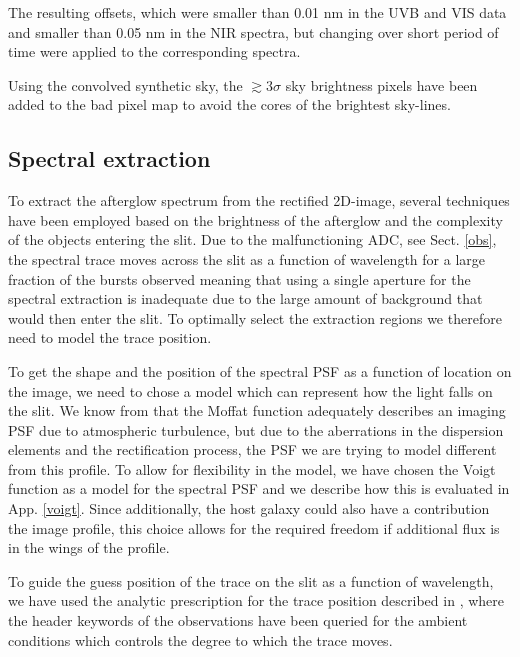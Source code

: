 \documentclass{aa}    %
\begin{document}
The resulting offsets, which were smaller than 0.01 nm in the UVB and VIS data
and smaller than 0.05 nm in the NIR spectra, but changing over short period of
time were applied to the corresponding spectra.

Using the convolved synthetic sky, the $\gtrsim 3 \sigma$ sky brightness pixels
have been added to the bad pixel map to avoid the cores of the brightest
sky-lines.

\subsection{Spectral extraction}    \label{extract}

To extract the afterglow spectrum from the rectified 2D-image, several
techniques have been employed based on the brightness of the afterglow and the
complexity of the objects entering the slit. Due to the malfunctioning ADC, see
Sect. \ref{obs}, the spectral trace moves across the slit as a function of
wavelength for a large fraction of the bursts observed meaning that using a
single aperture for the spectral extraction is inadequate due to the large
amount of background that would then enter the slit. To optimally select the
extraction regions we therefore need to model the trace position.

To get the shape and the position of the spectral PSF as a function of location
on the image, we need to chose a model which can represent how the light falls
on the slit. We know from \citet{Trujillo2001} that the Moffat function
\citep{Moffat1969} adequately describes an imaging PSF due to atmospheric
turbulence, but due to the aberrations in the dispersion elements and the
rectification process, the PSF we are trying to model different from this
profile. To allow for flexibility in the model, we have chosen the Voigt
function as a model for the spectral PSF and we describe how this is evaluated
in App. \ref{voigt}. Since additionally, the host galaxy could also have a
contribution the image profile, this choice allows for the required freedom if
additional flux is in the wings of the profile.

To guide the guess position of the trace on the slit as a function of
wavelength, we have used the analytic prescription for the trace position
described in \citet{Filippenko1982}, where the header keywords of the
observations have been queried for the ambient conditions which controls the
degree to which the trace moves.
\end{document}
